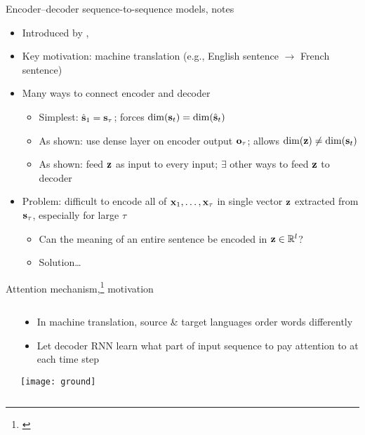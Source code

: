 \begin{frame}{Encoder--decoder sequence-to-sequence models, notes}
    \begin{itemize}[<.->]
        \item<+-> Introduced by \citet{ChoEMNLP14}, \citet{Sutskever14}
        \item Key motivation: machine translation (e.g., English sentence $\to$ French sentence)
        \item<+-> Many ways to connect encoder and decoder
        \begin{itemize}
            \item Simplest: $\hat{\mathbf{s}}_1 = \mathbf{s}_\tau$; forces $\dim(\mathbf{s}_t) = \dim(\hat{\mathbf{s}}_t)$
            \item As shown: use dense layer on encoder output $\mathbf{o}_\tau$; allows $\dim(\mathbf{z}) \ne \dim(\mathbf{s}_t)$
            \item As shown: feed $\mathbf{z}$ as input to every input; $\exists$ other ways to feed $\mathbf{z}$ to decoder
        \end{itemize}
        \item<+-> Problem: difficult to encode all of $\mathbf{x}_1, \dots, \mathbf{x}_\tau$ in single vector $\mathbf{z}$ extracted from $\mathbf{s}_\tau$, especially for large $\tau$
        \begin{itemize}
            \item Can the meaning of an entire sentence be encoded in $\mathbf{z} \in \mathbb{R}^l$?
            \item Solution\ldots
        \end{itemize}
    \end{itemize}
\end{frame}

\setcounter{footnote}{0}

\begin{frame}{Attention mechanism,\footnote{\citet{BahdanauICLR15}} motivation}
    \begin{columns}
        \begin{column}{0.6\textwidth}
            
        \end{column}
        \begin{column}{0.4\textwidth}
            \begin{itemize}
                \item In machine translation, source \& target languages order words differently
                \item Let decoder RNN learn what part of input sequence to pay attention to at each time step
            \end{itemize}

            \texttt{[image: ground]}
        \end{column}
    \end{columns}
\end{frame}

